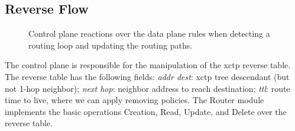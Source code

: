 \subsection{Reverse Flow}
\label{sec:reverse-flow}

\begin{figure}[!ht]
\centerline{
\qquad
\qquad \qquad
\qquad
} \caption{Control plane reactions over the data plane rules when detecting a routing loop and updating the routing paths.}
\label{fig:loop}
\end{figure}

The control plane is responsible for the manipulation of the \ac{xctp} reverse table. The reverse table has the following fields: \textit{addr dest}: \ac{xctp} tree descendant (but not 1-hop neighbor); \textit{next hop}: neighbor address to reach destination; \textit{\acs{ttl}}: route time to live, where we can apply removing policies. The Router module implements the basic operations Creation, Read, Update, and Delete over the reverse table.

